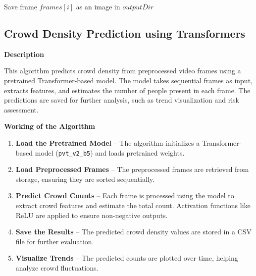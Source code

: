 \documentclass[11pt]{report}
\begin{document}

\begin{algorithm}[H]
\caption{Save Intermediate Frames}
\begin{algorithmic}[1]
        \State Save frame $frames[i]$ as an image in $outputDir$
    \EndFor
\EndFunction
\end{algorithmic}
\end{algorithm}

\subsection{Crowd Density Prediction using Transformers}
\textbf{Description}  

This algorithm predicts crowd density from preprocessed video frames using a pretrained Transformer-based model. The model takes sequential frames as input, extracts features, and estimates the number of people present in each frame. The predictions are saved for further analysis, such as trend visualization and risk assessment.  

\textbf{Working of the Algorithm}  

\begin{enumerate}
    \item \textbf{Load the Pretrained Model} – The algorithm initializes a Transformer-based model (\texttt{pvt\_v2\_b5}) and loads pretrained weights.  
    \item \textbf{Load Preprocessed Frames} – The preprocessed frames are retrieved from storage, ensuring they are sorted sequentially.  
    \item \textbf{Predict Crowd Counts} – Each frame is processed using the model to extract crowd features and estimate the total count. Activation functions like ReLU are applied to ensure non-negative outputs.  
    \item \textbf{Save the Results} – The predicted crowd density values are stored in a CSV file for further evaluation.  
    \item \textbf{Visualize Trends} – The predicted counts are plotted over time, helping analyze crowd fluctuations.  
\end{enumerate}  
\end{document}
